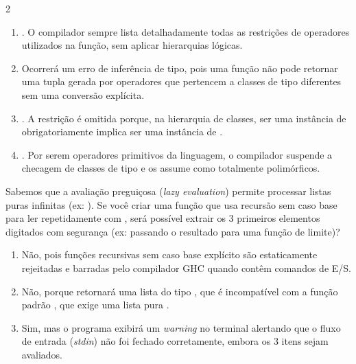 \documentclass[a4paper,10pt,brazil]{article}
\begin{document}
\begin{multicols}{2}
\begin{enumerate}
  \item {}. O compilador sempre lista detalhadamente todas as restrições de operadores utilizados na função, sem aplicar hierarquias lógicas.

  \item Ocorrerá um erro de inferência de tipo, pois uma função não pode retornar uma tupla gerada por operadores que pertencem a classes de tipo diferentes sem uma conversão explícita.

  \item {}. A restrição  é omitida porque, na hierarquia de classes, ser uma instância de  obrigatoriamente implica ser uma instância de .

  \item {}. Por serem operadores primitivos da linguagem, o compilador suspende a checagem de classes de tipo e os assume como totalmente polimórficos.


\end{enumerate}

Sabemos que a avaliação preguiçosa (\emph{lazy evaluation}) permite processar listas puras infinitas (ex: ). 
Se você criar uma função  que usa recursão sem caso base para ler repetidamente com , será possível extrair os 3 primeiros elementos digitados com segurança (ex: passando o resultado para uma função de limite)?

\begin{enumerate}
  \item Não, pois funções recursivas sem caso base explícito são estaticamente rejeitadas e barradas pelo compilador GHC quando contêm comandos de E/S.

  \item Não, porque  retornará uma lista do tipo \haskellinline{[IO String]}, que é incompatível com a função padrão , que exige uma lista pura \haskellinline{[a]}.

  \item Sim, mas o programa exibirá um \emph{warning} no terminal alertando que o fluxo de entrada (\emph{stdin}) não foi fechado corretamente, embora os 3 itens sejam avaliados.


\end{enumerate}
\end{multicols}
\end{document}
